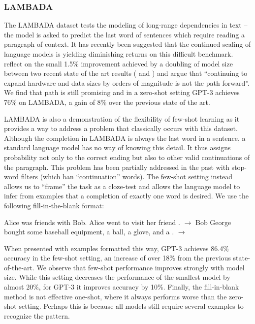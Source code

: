         \subsubsection{LAMBADA}
        \label{section:LAMBADA}

The LAMBADA dataset \cite{paperno2016lambada} tests the modeling of long-range dependencies in text -- the model is asked to predict the last word of sentences which require reading a paragraph of context. It has recently been suggested that the continued scaling of language models is yielding diminishing returns on this difficult benchmark. \cite{bisk2020experience} reflect on the small 1.5\% improvement achieved by a doubling of model size between two recent state of the art results (\cite{shoeybi2019megatronlm} and \cite{turing_17m}) and argue that ``continuing to expand hardware and data sizes by orders of magnitude is not the path forward''. We find that path is still promising and in a zero-shot setting GPT-3 achieves 76\% on LAMBADA, a gain of 8\% over the previous state of the art.

LAMBADA is also a demonstration of the flexibility of few-shot learning as it provides a way to address a problem that classically occurs with this dataset. Although the completion in LAMBADA is always the last word in a sentence, a standard language model has no way of knowing this detail. It thus assigns probability not only to the correct ending but also to other valid continuations of the paragraph. This problem has been partially addressed in the past with stop-word filters \cite{radford2019language} (which ban ``continuation'' words). The few-shot setting instead allows us to ``frame'' the task as a cloze-test and allows the language model to infer from examples that a completion of exactly one word is desired. We use the following fill-in-the-blank format:

Alice was friends with Bob.  Alice went to visit her friend \underline{}. $\to$ Bob George bought some baseball equipment, a ball, a glove, and a \underline{}. $\to$ 

When presented with examples formatted this way, GPT-3 achieves 86.4\% accuracy in the few-shot setting, an increase of over 18\% from the previous state-of-the-art. We observe that few-shot performance improves strongly with model size. While this setting decreases the performance of the smallest model by almost 20\%, for GPT-3 it improves accuracy by 10\%. Finally, the fill-in-blank method is not effective one-shot, where it always performs worse than the zero-shot setting. Perhaps this is because all models still require several examples to recognize the pattern.

